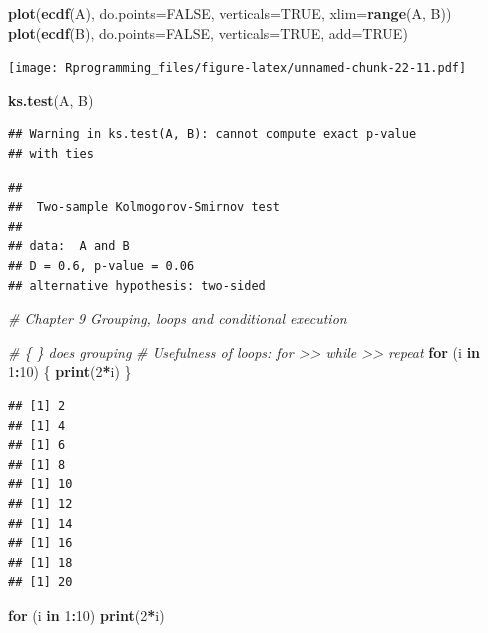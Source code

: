 \documentclass[10pt,]{krantz}
\makeatletter
\newenvironment{Shaded}{\begin{snugshade}}{\end{snugshade}}
\newcommand{\KeywordTok}[1]{\textcolor[rgb]{0.13,0.29,0.53}{\textbf{#1}}}
\newcommand{\DataTypeTok}[1]{\textcolor[rgb]{0.13,0.29,0.53}{#1}}
\newcommand{\DecValTok}[1]{\textcolor[rgb]{0.00,0.00,0.81}{#1}}
\newcommand{\CommentTok}[1]{\textcolor[rgb]{0.56,0.35,0.01}{\textit{#1}}}
\newcommand{\OtherTok}[1]{\textcolor[rgb]{0.56,0.35,0.01}{#1}}
\newcommand{\ControlFlowTok}[1]{\textcolor[rgb]{0.13,0.29,0.53}{\textbf{#1}}}
\newcommand{\OperatorTok}[1]{\textcolor[rgb]{0.81,0.36,0.00}{\textbf{#1}}}
\newcommand{\NormalTok}[1]{#1}
\newenvironment{kframe}{%
\medskip{}
\setlength{\fboxsep}{.8em}
 \def\at@end@of@kframe{}%
 \ifinner\ifhmode%
  \def\at@end@of@kframe{\end{minipage}}%
  \begin{minipage}{\columnwidth}%
 \fi\fi%
 \def\FrameCommand##1{\hskip\@totalleftmargin \hskip-\fboxsep
 \colorbox{shadecolor}{##1}\hskip-\fboxsep
     \hskip-\linewidth \hskip-\@totalleftmargin \hskip\columnwidth}%
 \MakeFramed {\advance\hsize-\width
   \@totalleftmargin\z@ \linewidth\hsize
   \@setminipage}}%
 {\par\unskip\endMakeFramed%
 \at@end@of@kframe}
\renewenvironment{Shaded}{\begin{kframe}}{\end{kframe}}
\makeatother
\begin{document}
\begin{Shaded}
\begin{Highlighting}[]
\KeywordTok{plot}\NormalTok{(}\KeywordTok{ecdf}\NormalTok{(A), }\DataTypeTok{do.points=}\OtherTok{FALSE}\NormalTok{, }\DataTypeTok{verticals=}\OtherTok{TRUE}\NormalTok{, }\DataTypeTok{xlim=}\KeywordTok{range}\NormalTok{(A, B))}
\KeywordTok{plot}\NormalTok{(}\KeywordTok{ecdf}\NormalTok{(B), }\DataTypeTok{do.points=}\OtherTok{FALSE}\NormalTok{, }\DataTypeTok{verticals=}\OtherTok{TRUE}\NormalTok{, }\DataTypeTok{add=}\OtherTok{TRUE}\NormalTok{)}
\end{Highlighting}
\end{Shaded}

\texttt{[image: Rprogramming\_files/figure-latex/unnamed-chunk-22-11.pdf]}

\begin{Shaded}
\begin{Highlighting}[]
\KeywordTok{ks.test}\NormalTok{(A, B)}
\end{Highlighting}
\end{Shaded}

\begin{verbatim}
## Warning in ks.test(A, B): cannot compute exact p-value
## with ties
\end{verbatim}

\begin{verbatim}
## 
##  Two-sample Kolmogorov-Smirnov test
## 
## data:  A and B
## D = 0.6, p-value = 0.06
## alternative hypothesis: two-sided
\end{verbatim}

\begin{Shaded}
\begin{Highlighting}[]
\CommentTok{# Chapter 9 Grouping, loops and conditional execution}

\CommentTok{# \{ \} does grouping}
\CommentTok{# Usefulness of loops: for >> while >> repeat}
\ControlFlowTok{for}\NormalTok{ (i }\ControlFlowTok{in} \DecValTok{1}\OperatorTok{:}\DecValTok{10}\NormalTok{) \{}
  \KeywordTok{print}\NormalTok{(}\DecValTok{2}\OperatorTok{*}\NormalTok{i)}
\NormalTok{\}}
\end{Highlighting}
\end{Shaded}

\begin{verbatim}
## [1] 2
## [1] 4
## [1] 6
## [1] 8
## [1] 10
## [1] 12
## [1] 14
## [1] 16
## [1] 18
## [1] 20
\end{verbatim}

\begin{Shaded}
\begin{Highlighting}[]
\ControlFlowTok{for}\NormalTok{ (i }\ControlFlowTok{in} \DecValTok{1}\OperatorTok{:}\DecValTok{10}\NormalTok{) }\KeywordTok{print}\NormalTok{(}\DecValTok{2}\OperatorTok{*}\NormalTok{i)}
\end{Highlighting}
\end{Shaded}
\end{document}
